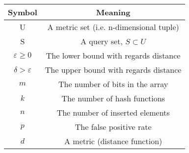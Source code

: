 \begin{tabular}{c|c}
Symbol & Meaning \\ 
\hline
U & A metric set (i.e. n-dimensional tuple) \\ 
S & A query set, $S  \subset U$ \\ 
$\varepsilon \geq 0$& The lower bound with regards distance \\
$\delta > \varepsilon$ & The upper bound with regards distance \\
\hline
$m$ & The number of bits in the array \\
$k$ & The number of hash functions \\
$n$ & The number of inserted elements \\
$p$ & The false positive rate \\
$d$ & A metric (distance function)
\end{tabular}